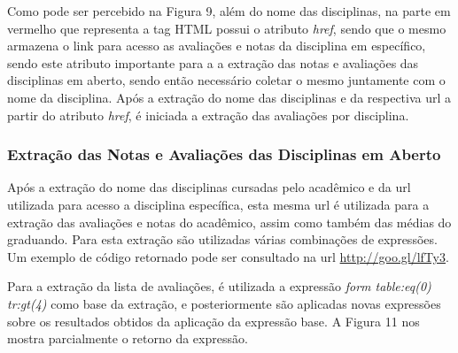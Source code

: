 Como pode ser percebido na Figura 9, além do nome das disciplinas, na parte em vermelho que representa a tag HTML possui o atributo \emph{href}, sendo que o mesmo armazena o link para acesso as avaliações e notas da disciplina em específico, sendo este atributo importante para a a extração das notas e avaliações das disciplinas em aberto, sendo então necessário coletar o mesmo juntamente com o nome da disciplina. Após a extração do nome das disciplinas e da respectiva url a partir do atributo \emph{href}, é iniciada a extração das avaliações por disciplina.

\subsubsection{Extração das Notas e Avaliações das Disciplinas em Aberto}
Após a extração do nome das disciplinas cursadas pelo acadêmico e da url utilizada para acesso a disciplina específica, esta mesma url é utilizada para a extração das avaliações e notas do acadêmico, assim como também das médias do graduando. Para esta extração são utilizadas várias combinações de expressões. Um exemplo de código retornado pode ser consultado na url \url{http://goo.gl/lfTy3}.

Para a extração da lista de avaliações, é utilizada a expressão \emph{form table:eq(0) tr:gt(4)} como base da extração, e posteriormente são aplicadas novas expressões sobre os resultados obtidos da aplicação da expressão base. A Figura 11 nos mostra parcialmente o retorno da expressão.

